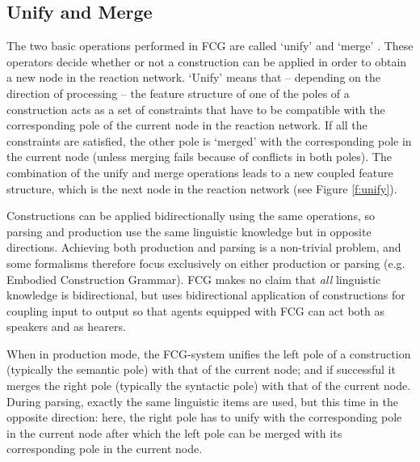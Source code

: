 \vspace{0.3cm}
\subsection{Unify and Merge} 
The two basic operations performed in FCG are called `unify' and `merge' \citep[not to be confused with `merge' in Minimalism]{steels06unify}. These operators decide whether or not a construction can be applied in order to obtain a new node in the reaction network. `Unify' means that -- depending on the direction of processing -- the feature structure of one of the poles of a construction acts as a set of constraints that have to be compatible with the corresponding pole of the current node in the reaction network. If all the constraints are satisfied, the other pole is `merged' with the corresponding pole in the current node (unless merging fails because of conflicts in both poles). The combination of the unify and merge operations leads to a new coupled feature structure, which is the next node in the reaction network (see Figure \ref{f:unify}).

Constructions can be applied bidirectionally using the same operations, so parsing and production use the same linguistic knowledge but in opposite directions. Achieving both production and parsing is a non-trivial problem, and some formalisms therefore focus exclusively on either production or parsing (e.g. Embodied Construction Grammar). FCG makes no claim that {\em all} linguistic knowledge is bidirectional, but uses bidirectional application of constructions for coupling input to output so that agents equipped with FCG can act both as speakers and as hearers. 

When in production mode, the FCG-system unifies the left pole of a construction (typically the semantic pole) with that of the current node; and if successful it merges the right pole (typically the syntactic pole) with that of the current node. During parsing, exactly the same linguistic items are used, but this time in the opposite direction: here, the right pole has to unify with the corresponding pole in the current node after which the left pole can be merged with its corresponding pole in the current node.

